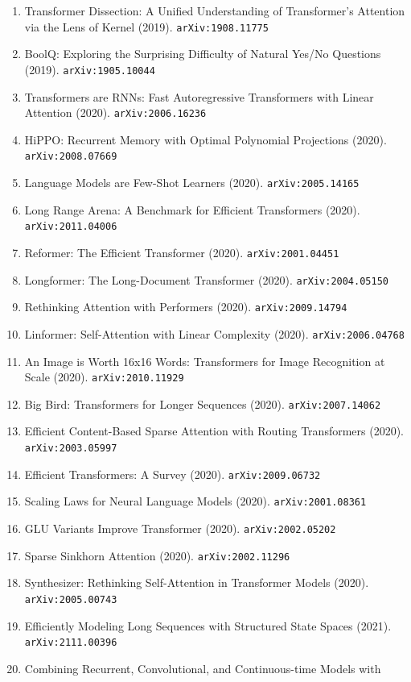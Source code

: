 \documentclass[11pt]{article}
\begin{document}
\begin{enumerate}
  \item Transformer Dissection: A Unified Understanding of Transformer's
  Attention via the Lens of Kernel (2019). \texttt{arXiv:1908.11775}
  \item BoolQ: Exploring the Surprising Difficulty of Natural Yes/No Questions (2019). \texttt{arXiv:1905.10044}
  \item Transformers are RNNs: Fast Autoregressive Transformers with Linear
  Attention (2020). \texttt{arXiv:2006.16236}
  \item HiPPO: Recurrent Memory with Optimal Polynomial Projections (2020). \texttt{arXiv:2008.07669}
  \item Language Models are Few-Shot Learners (2020). \texttt{arXiv:2005.14165}
  \item Long Range Arena: A Benchmark for Efficient Transformers (2020). \texttt{arXiv:2011.04006}
  \item Reformer: The Efficient Transformer (2020). \texttt{arXiv:2001.04451}
  \item Longformer: The Long-Document Transformer (2020). \texttt{arXiv:2004.05150}
  \item Rethinking Attention with Performers (2020). \texttt{arXiv:2009.14794}
  \item Linformer: Self-Attention with Linear Complexity (2020). \texttt{arXiv:2006.04768}
  \item An Image is Worth 16x16 Words: Transformers for Image Recognition at
  Scale (2020). \texttt{arXiv:2010.11929}
  \item Big Bird: Transformers for Longer Sequences (2020). \texttt{arXiv:2007.14062}
  \item Efficient Content-Based Sparse Attention with Routing Transformers (2020). \texttt{arXiv:2003.05997}
  \item Efficient Transformers: A Survey (2020). \texttt{arXiv:2009.06732}
  \item Scaling Laws for Neural Language Models (2020). \texttt{arXiv:2001.08361}
  \item GLU Variants Improve Transformer (2020). \texttt{arXiv:2002.05202}
  \item Sparse Sinkhorn Attention (2020). \texttt{arXiv:2002.11296}
  \item Synthesizer: Rethinking Self-Attention in Transformer Models (2020). \texttt{arXiv:2005.00743}
  \item Efficiently Modeling Long Sequences with Structured State Spaces (2021). \texttt{arXiv:2111.00396}
  \item Combining Recurrent, Convolutional, and Continuous-time Models with

\end{enumerate}
\end{document}
